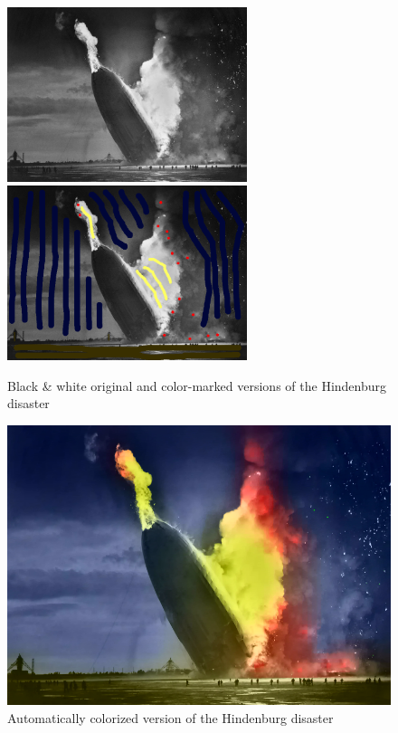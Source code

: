 \documentclass{article}
\begin{document}
\begin{figure}
    \centering
    \includegraphics[width=7cm]{pictures/colorization_hindenburg_ref.png}
    \includegraphics[width=7cm]{pictures/colorization_hindenburg_target.png}
    \caption{Black \& white original and color-marked versions of the Hindenburg disaster}
    \label{fig:hindenburg_original}
\end{figure}

\begin{figure}
    \centering
    \includegraphics[width=13cm]{pictures/colorization_hindenburg_new.png}
    \caption{Automatically colorized version of the Hindenburg disaster}
    \label{fig:hindenburg}
\end{figure}
\end{document}
